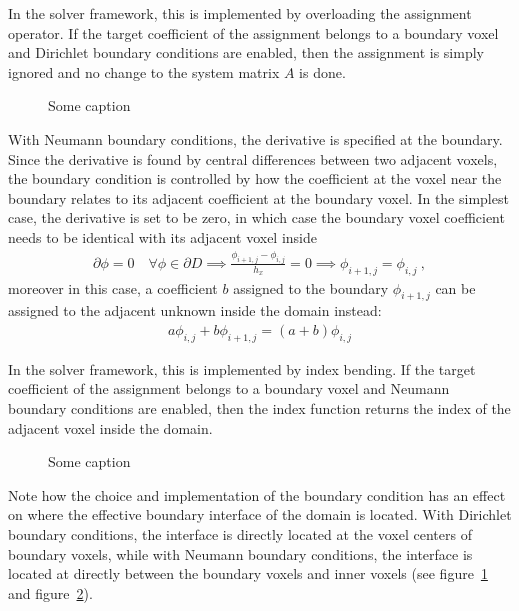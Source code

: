 In the solver framework, this is implemented by overloading the assignment operator. If the target coefficient of the assignment belongs to a boundary voxel and Dirichlet boundary conditions are enabled, then the assignment is simply ignored and no change to the system matrix $A$ is done.
\begin{figure}[h]
\centering
{}
\caption{Some caption}
\label{fig:pn_bc_dirichlet}
\end{figure}

With Neumann boundary conditions, the derivative is specified at the boundary. Since the derivative is found by central differences between two adjacent voxels, the boundary condition is controlled by how the coefficient at the voxel near the boundary relates to its adjacent coefficient at the boundary voxel. In the simplest case, the derivative is set to be zero, in which case the boundary voxel coefficient needs to be identical with its adjacent voxel inside
\begin{align*}
\partial\phi=0\quad\forall\phi\in\partial D
\implies
\frac{\phi_{i+1,j}-\phi_{i,j}}{h_x} = 0
\implies
\phi_{i+1,j}=\phi_{i,j}
\ ,
\end{align*}
moreover in this case, a coefficient $b$ assigned to the boundary $\phi_{i+1,j}$ can be assigned to the adjacent unknown inside the domain instead:
\begin{align}
a\phi_{i,j} + b\phi_{i+1,j} = \left(a+b\right)\phi_{i,j}
\end{align}

In the solver framework, this is implemented by index bending. If the target coefficient of the assignment belongs to a boundary voxel and Neumann boundary conditions are enabled, then the index function returns the index of the adjacent voxel inside the domain.
\begin{figure}[h]
\centering
{}
\caption{Some caption}
\label{fig:pn_bc_neumann}
\end{figure}

Note how the choice and implementation of the boundary condition has an effect on where the effective boundary interface of the domain is located. With Dirichlet boundary conditions, the interface is directly located at the voxel centers of boundary voxels, while with Neumann boundary conditions, the interface is located at directly between the boundary voxels and inner voxels (see figure~\ref{fig:pn_bc_dirichlet} and figure~\ref{fig:pn_bc_neumann}).

